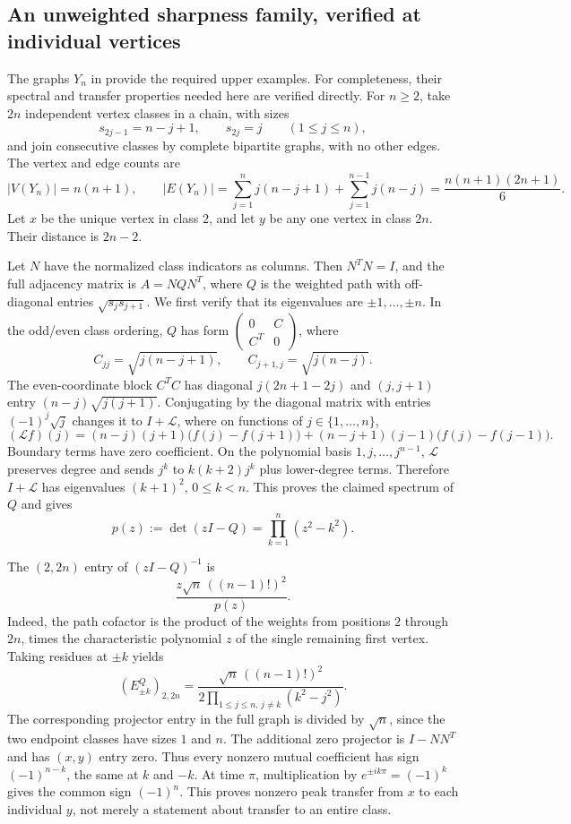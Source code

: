 \documentclass[11pt,a4paper]{article}
\theoremstyle{definition}\newtheorem{definition}[lemma]{Definition}
\theoremstyle{remark}\newtheorem{remark}[lemma]{Remark}
\newcommand{\C}{\mathbb C}\newcommand{\R}{\mathbb R}
\begin{document}
\subsection{An unweighted sharpness family, verified at individual vertices}

The graphs $Y_n$ in \cite[Section~6.3]{CGS25} provide the required
upper examples. For completeness, their spectral and transfer properties
needed here are verified directly. For $n\geq2$, take $2n$ independent
vertex classes in a chain, with sizes
\[
 s_{2j-1}=n-j+1,\qquad s_{2j}=j\qquad(1\leq j\leq n),
\]
and join consecutive classes by complete bipartite graphs, with no other
edges. The vertex and edge counts are
\begin{equation}\label{eq:Yn-counts}
 |V(Y_n)|=n(n+1),\qquad
 |E(Y_n)|=\sum_{j=1}^n j(n-j+1)+\sum_{j=1}^{n-1}j(n-j)
          =\frac{n(n+1)(2n+1)}6.
\end{equation}
Let $x$ be the unique vertex in class $2$, and let $y$ be any one vertex
in class $2n$. Their distance is $2n-2$.

Let $N$ have the normalized class indicators as columns. Then $N^TN=I$,
and the full adjacency matrix is $A= NQN^T$, where $Q$ is the weighted
path with off-diagonal entries $\sqrt{s_js_{j+1}}$.
We first verify that its eigenvalues are $\pm1,\ldots,\pm n$.
In the odd/even class ordering, $Q$ has form
$\left(\begin{smallmatrix}0&C\\C^T&0\end{smallmatrix}\right)$, where
\[
 C_{jj}=\sqrt{j(n-j+1)},\qquad
 C_{j+1,j}=\sqrt{j(n-j)}.
\]
The even-coordinate block $C^TC$ has diagonal $j(2n+1-2j)$ and
$(j,j+1)$ entry $(n-j)\sqrt{j(j+1)}$. Conjugating by the diagonal
matrix with entries $(-1)^j\sqrt j$ changes it to $I+\mathcal L$, where
on functions of $j\in\{1,\ldots,n\}$,
\[
 (\mathcal Lf)(j)=(n-j)(j+1)\bigl(f(j)-f(j+1)\bigr)
 +(n-j+1)(j-1)\bigl(f(j)-f(j-1)\bigr).
\]
Boundary terms have zero coefficient. On the polynomial basis
$1,j,\ldots,j^{n-1}$, $\mathcal L$ preserves degree and sends $j^k$ to
$k(k+2)j^k$ plus lower-degree terms. Therefore $I+\mathcal L$ has
eigenvalues $(k+1)^2$, $0\leq k<n$. This proves the claimed spectrum
of $Q$ and gives
\[
 p(z):=\det(zI-Q)=\prod_{k=1}^n(z^2-k^2).
\]

The $(2,2n)$ entry of $(zI-Q)^{-1}$ is
\[
 \frac{z\sqrt n\,((n-1)!)^2}{p(z)}.
\]
Indeed, the path cofactor is the product of the weights from positions
$2$ through $2n$, times the characteristic polynomial $z$ of the single
remaining first vertex. Taking residues at $\pm k$ yields
\[
 (E^Q_{\pm k})_{2,2n}
 =\frac{\sqrt n\,((n-1)!)^2}
        {2\prod_{1\leq j\leq n,\,j\ne k}(k^2-j^2)}.
\]
The corresponding projector entry in the full graph is divided by
$\sqrt n$, since the two endpoint classes have sizes $1$ and $n$.
The additional zero projector is $I-NN^T$ and has $(x,y)$ entry zero.
Thus every nonzero mutual coefficient has sign $(-1)^{n-k}$, the same
at $k$ and $-k$. At time $\pi$, multiplication by
$e^{\pm ik\pi}=(-1)^k$ gives the common sign $(-1)^n$.
This proves nonzero peak transfer from $x$ to each individual $y$, not
merely a statement about transfer to an entire class.
\end{document}
